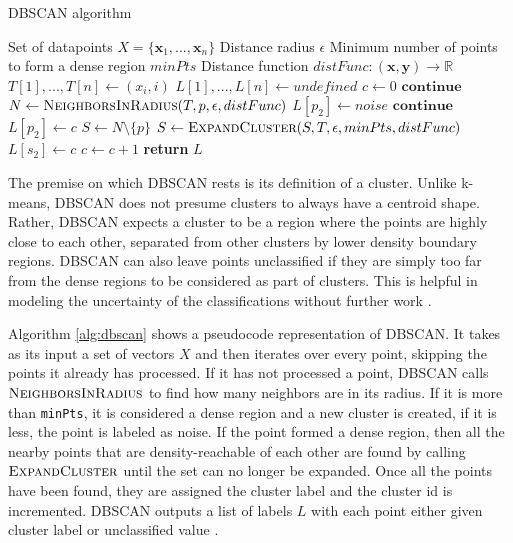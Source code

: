 \begin{algorithm}
\caption{DBSCAN algorithm \cite{dbscan-1996}}\label{alg:dbscan}
\begin{algorithmic}[1]
\Require Set of datapoints $X=\{\mathbf{x}_1, ..., \mathbf{x}_n\}$
\Require Distance radius $\epsilon$
\Require Minimum number of points to form a dense region $minPts$
\Require Distance function $distFunc: (\mathbf{x}, \mathbf{y}) \xrightarrow{} \mathbb{R}$
  \State $T[1], ..., T[n] \gets (x_i, i)$ 
  \State $L[1], ..., L[n] \gets undefined$ 
  \State $c \gets 0$ 
      \State $\mathbf{continue}$ 
    \EndIf
    \State $N \gets \Call{NeighborsInRadius}{T, p, \epsilon, distFunc}$
      \State $L[p_2] \gets noise$ 
      \State $\mathbf{continue}$
    \EndIf
    \State $L[p_2] \gets c$ 
    \State $S \gets N \setminus \{p\}$ 
    \State $S \gets \Call{ExpandCluster}{S, T, \epsilon, minPts, distFunc}$
      \State $L[s_2] \gets c$ 
    \EndFor
    \State $c \gets c + 1$ 
  \EndFor
  \State \textbf{return} $L$
\EndProcedure
\end{algorithmic}
\end{algorithm}

The premise on which DBSCAN rests is its definition of a cluster. Unlike k-means, DBSCAN does not presume clusters to always have a centroid shape. Rather, DBSCAN expects a cluster to be a region where the points are highly close to each other, separated from other clusters by lower density boundary regions. DBSCAN can also leave points unclassified if they are simply too far from the dense regions to be considered as part of clusters. This is helpful in modeling the uncertainty of the classifications without further work \cite{ma-kmeans-dbscan-timeseries, dbscan-1996}.

Algorithm \ref{alg:dbscan} shows a pseudocode representation of DBSCAN. It takes as its input a set of vectors $X$ and then iterates over every point, skipping the points it already has processed. If it has not processed a point, DBSCAN calls $\Call{NeighborsInRadius}{}$ to find how many neighbors are in its radius. If it is more than \texttt{minPts}, it is considered a dense region and a new cluster is created, if it is less, the point is labeled as noise. If the point formed a dense region, then all the nearby points that are density-reachable of each other are found by calling $\Call{ExpandCluster}{}$ until the set can no longer be expanded. Once all the points have been found, they are assigned the cluster label and the cluster id is incremented. DBSCAN outputs a list of labels $L$ with each point either given cluster label or unclassified value \cite{dbscan-1996, data-mining-2011}.

